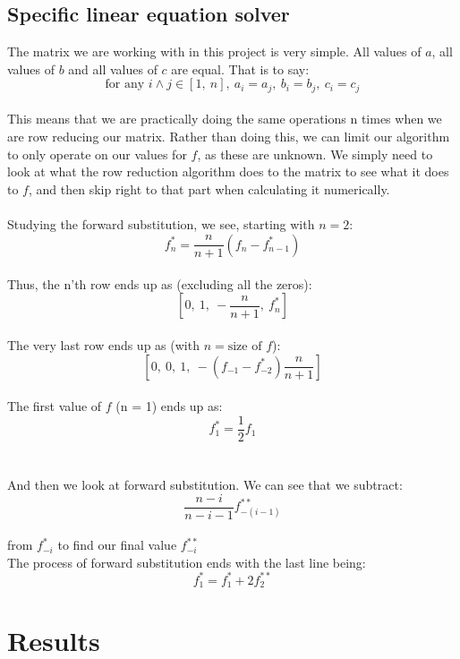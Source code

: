\documentclass[a4paper,12pt,norsk]{article}
\begin{document}
\subsection{Specific linear equation solver}
	The matrix we are working with in this project is very simple. All values of $a$, all values of $b$ and all values of $c$ are equal. That is to say: 
	$$\text{for any }i \wedge j \in [1,\ n],\ a_i = a_j,\ b_i = b_j,\ c_i = c_j$$\\
	This means that we are practically doing the same operations n times when we are row reducing our matrix. Rather than doing this, we can limit our algorithm to only operate on our values for $f$, as these are unknown. We simply need to look at what the row reduction algorithm does to the matrix to see what it does to $f$, and then skip right to that part when calculating it numerically.\\
	\\
	Studying the forward substitution, we see, starting with $n = 2$:
	$$f_n^* = \frac{n}{n+1}(f_n - f_{n-1}^*) $$\\
	Thus, the n'th row ends up as (excluding all the zeros):
	$$[0,\ 1,\ -\frac{n}{n+1},\ f_n^*] $$\\
	The very last row ends up as (with $n = \text{size of $f$}$):
	$$[0,\ 0,\ 1,\ -(f_{-1}-f^*_{-2})\frac{n}{n+1}] $$\\
	The first value of $f$ (n = 1) ends up as:
	$$f_1^* = \frac{1}{2}f_1 $$\\
	\\
	And then we look at forward substitution. We can see that we subtract:
	$$\frac{n-i}{n-i-1}f^{**}_{-(i-1)} $$\\
	from $f^*_{-i}$ to find our final value $f_{-i}^{**}$\\
	The process of forward substitution ends with the last line being:
	$$f^*_1 = f^*_1 + 2f_2^{**} $$
	
	
\section{Results}
\end{document}
